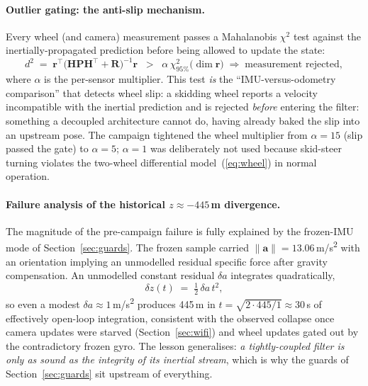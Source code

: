 \paragraph{Outlier gating: the anti-slip mechanism.} Every wheel (and
camera) measurement passes a Mahalanobis $\chi^2$ test against the
inertially-propagated prediction before being allowed to update the state:
\begin{equation}
d^2 \;=\; \mathbf{r}^{\!\top}
\big(\mathbf{H}\mathbf{P}\mathbf{H}^{\!\top} + \mathbf{R}\big)^{-1}
\mathbf{r}
\;\;>\;\; \alpha\,\chi^2_{95\%}\!\big(\dim\mathbf{r}\big)
\;\Longrightarrow\; \text{measurement rejected},
\label{eq:chi2}
\end{equation}
where $\alpha$ is the per-sensor multiplier. This test \emph{is} the
``IMU-versus-odometry comparison'' that detects wheel slip: a skidding wheel
reports a velocity incompatible with the inertial prediction and is rejected
\emph{before} entering the filter: something a decoupled architecture
cannot do, having already baked the slip into an upstream pose. The campaign
tightened the wheel multiplier from $\alpha=15$ (slip passed the gate) to
$\alpha=5$; $\alpha=1$ was deliberately not used because skid-steer turning
violates the two-wheel differential model~(\ref{eq:wheel}) in normal
operation.

\paragraph{Failure analysis of the historical $z\approx-445$\,m divergence.}
The magnitude of the pre-campaign failure is fully explained by the frozen-IMU
mode of Section~\ref{sec:guards}. The frozen sample carried
$\lVert\mathbf{a}\rVert = 13.06$\,m/s\textsuperscript{2} with an orientation
implying an unmodelled residual specific force after gravity compensation.
An unmodelled constant residual $\delta a$ integrates quadratically,
\begin{equation}
\delta z(t) \;=\; \tfrac{1}{2}\,\delta a\, t^{2},
\end{equation}
so even a modest $\delta a \approx 1$\,m/s\textsuperscript{2} produces 445\,m
in $t = \sqrt{2\cdot445/1} \approx 30$\,s of effectively open-loop
integration, consistent with the observed collapse once camera updates
were starved (Section~\ref{sec:wifi}) and wheel updates gated out by the
contradictory frozen gyro. The lesson generalises: \emph{a tightly-coupled
filter is only as sound as the integrity of its inertial stream}, which is
why the guards of Section~\ref{sec:guards} sit upstream of everything.

